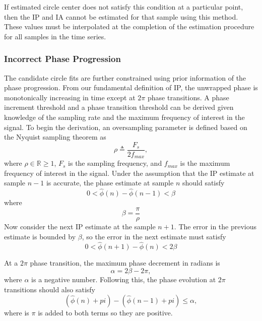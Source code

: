 \documentclass[a4paper]{IEEEtran}
\begin{document}
If estimated circle center does not satisfy this condition at a particular point, then the IP and IA cannot be estimated for that sample using this method. These values must be interpolated at the completion of the estimation procedure for all samples in the time series. 

\subsubsection{Incorrect Phase Progression}
The candidate circle fits are further constrained using prior information of the phase progression. From our fundamental definition of IP, the unwrapped phase is monotonically increasing in time except at $2\pi$ phase transitions. A phase increment threshold and a phase transition threshold can be derived given knowledge of the sampling rate and the maximum frequency of interest in the signal. To begin the derivation, an oversampling parameter is defined based on the Nyquist sampling theorem as
\begin{equation}
	\rho\triangleq\frac{F_s}{2f_{max}},
\end{equation}
where $\rho \in \mathbb{R} \ge 1$, $F_s$ is the sampling frequency, and $f_{max}$ is the maximum frequency of interest in the signal. Under the assumption that the IP estimate at sample $n-1$ is accurate, the phase estimate at sample $n$ should satisfy
\begin{equation}
	0 < \hat\phi(n)-\hat\phi(n-1) < \beta
\end{equation}
where 
\begin{equation}
	\beta = \frac{\pi}{\rho}
\end{equation}
Now consider the next IP estimate at the sample $n+1$. The error in the previous estimate is bounded by $\beta$, so the error in the next estimate must satisfy
\begin{equation}\label{eq:Prior1}
	0 < \hat\phi(n+1)-\hat\phi(n) < 2\beta
\end{equation} 

At a $2\pi$ phase transition, the maximum phase decrement in radians is
\begin{equation}
	\alpha=2\beta-2\pi,
\end{equation}
where $\alpha$ is a negative number. Following this, the phase evolution at $2\pi$ transitions should also satisfy
\begin{equation}\label{eq:Prior2}
(\hat{\phi} \left( n \right)+pi) - (\hat{\phi} \left( n-1\right)+pi) \le \alpha, 
\end{equation}
where is $\pi$ is added to both terms so they are positive.
\end{document}
